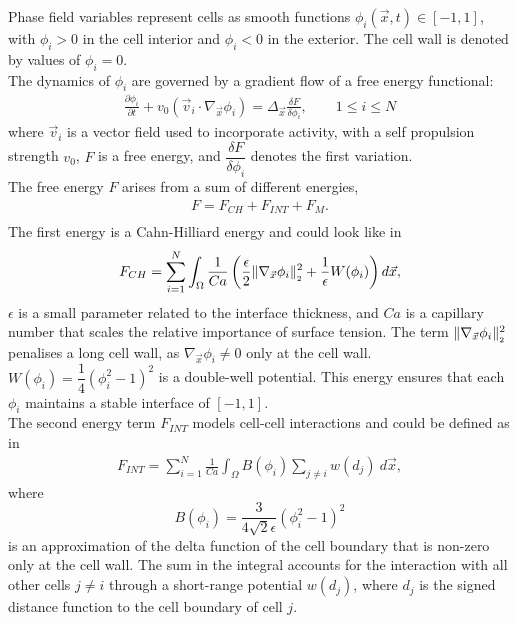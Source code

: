 Phase field variables represent cells as smooth functions $\phi_i(\vec{x}, t) \in [-1, 1]$, with $\phi_i > 0$ in the cell interior and $\phi_i <0$ in the exterior. 
The cell wall is denoted by values of $\phi_i = 0$. \\
The dynamics of $\phi_i$ are governed by a gradient flow of a free energy functional:
\begin{align*}
	\frac{\partial \phi_i}{\partial t} + v_0 (\vec{v}_i \cdot \nabla_{\vec{x}} \phi_i) = \Delta_{\vec{x}} \frac{\delta F}{\delta \phi_i}, \qquad 1 \leq i \leq N 
\end{align*}
where $\vec{v}_i$ is a vector field used to incorporate activity, with a self propulsion strength $v_0$, $F$ is a free energy, and $\dfrac{\delta F}{\delta \phi_i}$ denotes the first variation.\\
The free energy $F$ arises from a sum of different energies, 
\begin{align*}
	F = F_{CH} + F_{INT} + F_{M}. \\
\end{align*}
The first energy is a Cahn-Hilliard energy and could look like in~\cite{wenzel2021}
\begin{align*} 
	F_{CH} = \sum\limits_{i=1}^N \int_{\Omega} \dfrac{1}{Ca} \left( \dfrac{\epsilon}{2} \norm[\nabla_{\vec{x}} \phi_i]^2 + \dfrac{1}{\epsilon} W(\phi_i) \right) d\vec{x},
\end{align*}
$\epsilon$ is a small parameter related to the interface thickness, and $Ca$ is a capillary number that scales the relative importance of surface tension.
The term $\norm[\nabla_{\vec{x}} \phi_i]^2$ penalises a long cell wall, as $\nabla_{\vec{x}} \phi_i \neq 0$ only at the cell wall.
$W(\phi_i) = \dfrac{1}{4} (\phi_i^2 - 1)^2$ is a double-well potential. 
This energy ensures that each $\phi_i$ maintains a stable interface of $[-1,1]$.  \\ 
The second energy term $F_{INT}$ models cell-cell interactions and could be defined as in~\cite{wenzel2021}
\begin{align*}
	F_{INT} = \sum\limits_{i=1}^N \frac{1}{Ca} \int_{\Omega} B(\phi_i) \sum\limits_{j \neq i} w(d_j) \: d\vec{x},
\end{align*}
where 
\[B(\phi_i) = \dfrac{3}{4\sqrt{2}\epsilon} (\phi_i^2 - 1)^2\]
is an approximation of the delta function of the cell boundary that is non-zero only at the cell wall.
The sum in the integral accounts for the interaction with all other cells $j \neq i$ through a short-range potential $w(d_j)$, where $d_j$ is the signed distance function to the cell boundary of cell $j$.  

